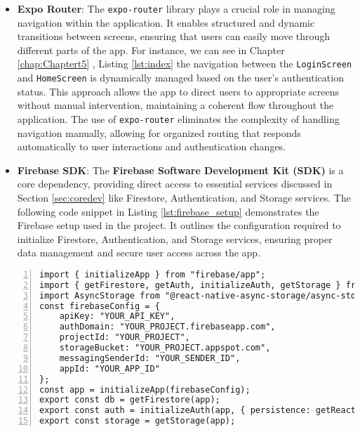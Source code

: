 \begin{itemize}
     \item \textbf{Expo Router}: 
     The \texttt{expo-router} library plays a crucial role in managing navigation within the application. It enables structured and dynamic transitions between screens, ensuring that users can easily move through different parts of the app. For instance, we can see in Chapter \ref{chap:Chaptert5} , Listing \ref{lst:index} the navigation between the \texttt{LoginScreen} and \texttt{HomeScreen} is dynamically managed based on the user’s authentication status. This approach allows the app to direct users to appropriate screens without manual intervention, maintaining a coherent flow throughout the application. The use of \texttt{expo-router} eliminates the complexity of handling navigation manually, allowing for organized routing that responds automatically to user interactions and authentication changes.

    \item \textbf{Firebase SDK}: The \textbf{Firebase Software Development Kit (SDK)} is a core dependency, providing direct access to essential services discussed in Section \ref{sec:coredev} like Firestore, Authentication, and Storage services.
    The following code snippet in Listing \ref{lst:firebase_setup} demonstrates the Firebase setup used in the project. It outlines the configuration required to initialize Firestore, Authentication, and Storage services, ensuring proper data management and secure user access across the app\cite{firebasecookbook}.

\end{itemize}
\begin{lstlisting}[caption={Firebase Setup}, label={lst:firebase_setup}, numbers=left,stepnumber=1, numberstyle=\tiny\color{gray}]
import { initializeApp } from "firebase/app";
import { getFirestore, getAuth, initializeAuth, getStorage } from "firebase";
import AsyncStorage from "@react-native-async-storage/async-storage";
const firebaseConfig = {
    apiKey: "YOUR_API_KEY",
    authDomain: "YOUR_PROJECT.firebaseapp.com",
    projectId: "YOUR_PROJECT",
    storageBucket: "YOUR_PROJECT.appspot.com",
    messagingSenderId: "YOUR_SENDER_ID",
    appId: "YOUR_APP_ID"
};
const app = initializeApp(firebaseConfig);
export const db = getFirestore(app);
export const auth = initializeAuth(app, { persistence: getReactNativePersistence(AsyncStorage) });
export const storage = getStorage(app);
\end{lstlisting}


